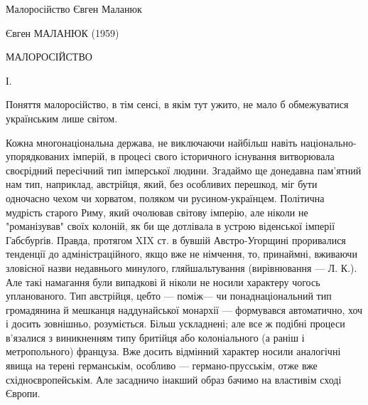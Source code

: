  
 
 
 
 


Малоросійство
Євген Маланюк

Євген МАЛАНЮК (1959)

МАЛОРОСІЙСТВО

І.

Поняття малоросійство, в тім сенсі, в якім тут ужито, не мало б обмежуватися українським лише світом.

Кожна многонаціональна держава, не виключаючи найбільш навіть
національно-упорядкованих імперій, в процесі свого історичного існування
витворювала своєрідний пересічний тип імперської людини. Згадаймо ще донедавна
пам'ятний нам тип, наприклад, австрійця, який, без особливих перешкод, міг бути
одночасно чехом чи хорватом, поляком чи русином-українцем. Політична мудрість
старого Риму, який очолював світову імперію, але ніколи не "романізував" своїх
колоній, як би ще дотлівала в устрою віденської імперії Габсбурґів. Правда,
протягом XIX ст. в бувшій Австро-Угорщині проривалися тенденції до
адміністраційного, якщо вже не німчення, то, принаймні, вживаючи зловісної
назви недавнього минулого, гляйшальтування (вирівнювання — Л. К.). Але такі
намагання були випадкові й ніколи не носили характеру чогось упланованого. Тип
австрійця, цебто — поміж— чи понаднаціональний тип громадянина й мешканця
наддунайської монархії — формувався автоматично, хоч і досить зовнішньо,
розуміється. Більш ускладнені; але все ж подібні процеси в'язалися з
виникненням типу бритійця або колоніального (а раніш і метропольного) француза.
Вже досить відмінний характер носили аналогічні явища на терені германськім,
особливо — германо-прусськім, отже вже східноєвропейськім. Але засадничо
інакший образ бачимо на властивім сході Європи.

